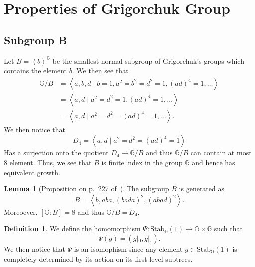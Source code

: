 \documentclass[11pt,a4paper,reqno]{amsart}
\theoremstyle{plain}
\theoremstyle{definition}
\newtheorem{lemma}[theorem]{Lemma}
\newtheorem{definition}[theorem]{Definition}
\theoremstyle{definition}
\begin{document}
\section{Properties of Grigorchuk Group}

%
%
%

\subsection{Subgroup B}

Let $B = \left\langle b\right\rangle^{\mathbb G}$ be the smallest normal subgroup of Grigorchuk's groups which contains the element $b$.
We then see that
\begin{align*}
  \mathbb G/B
  &=
  \left\langle
    a,b,d
  \mid
    b = 1, a^2=b^2=d^2=1, (ad)^{4}=1, \ldots
  \right\rangle
  \\
  &=
  \left\langle
    a,d
  \mid
    a^2=d^2=1, (ad)^{4}=1, \ldots
  \right\rangle
  \\
  &=
  \left\langle
    a,d
  \mid
    a^2=d^2=(ad)^4=1,\ldots
  \right\rangle.
\end{align*}
We then notice that
\[
  D_{4}= 
  \left\langle
    a,d
  \mid
    a^2=d^2=(ad)^4=1
  \right\rangle
\]
Has a surjection onto the quotient $D_4\to \mathbb G/B$ and thus $\mathbb G/B$ can contain at most $8$ element.
Thus, we see that $B$ is finite index in the group $\mathbb G$ and hence has equivalent growth.

\begin{lemma}[Proposition on p.~227 of~\cite{Pierre2000}]
  The subgroup $B$ is generated as 
  \[
    B
    =
    \left\langle
      b,aba,(bada)^2,(abad)^2
    \right\rangle.
  \]
  Moreoever, $[\mathbb G:B]=8$ and thus $\mathbb G/B = D_4$.
\end{lemma}

\begin{definition}
  We define the homomorphism $\Psi\colon \mathrm{Stab}_{\mathbb G}(1) \to \mathbb G\times \mathbb G$
  such that
  \[
    \Psi(g)
    =
    (g|_0,g|_1).
  \]
  We then notice that $\Psi$ is an isomophism since any element $g \in \mathrm{Stab}_{\mathbb G}(1)$ is completely determined by
  its action on its first-level subtrees.
\end{definition}
\end{document}
